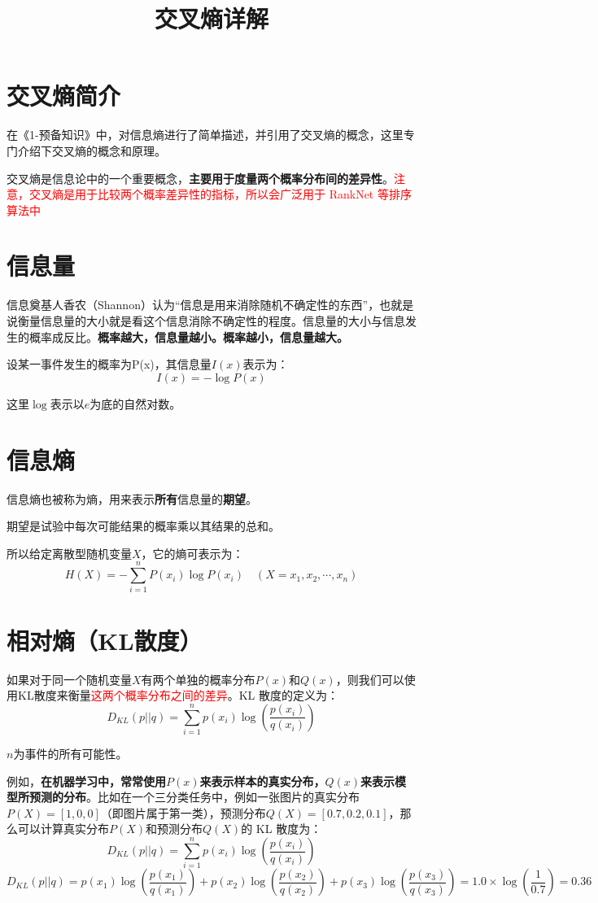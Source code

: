 \documentclass[12pt]{article}
\title{交叉熵详解\cite{CrossEntropy_Detail}}
\begin{document}
\section{交叉熵简介\cite{CrossEntropy_Detail}}
在《1-预备知识》中，对信息熵进行了简单描述，并引用了交叉熵的概念，这里专门介绍下交叉熵的概念和原理。

交叉熵是信息论中的一个重要概念，\textbf{主要用于度量两个概率分布间的差异性}。\textcolor{red}{注意，交叉熵是用于比较两个概率差异性的指标，所以会广泛用于 RankNet 等排序算法中}

\section{信息量}
信息奠基人香农（Shannon）认为“信息是用来消除随机不确定性的东西”，也就是说衡量信息量的大小就是看这个信息消除不确定性的程度。信息量的大小与信息发生的概率成反比。\textbf{概率越大，信息量越小。概率越小，信息量越大。}

设某一事件发生的概率为P(x)，其信息量$I(x)$表示为：
$$
I(x) = -\log{P(x)}
$$

这里$\log$表示以$e$为底的自然对数。

\section{信息熵}
信息熵也被称为熵，用来表示\textbf{所有}信息量的\textbf{期望}。

期望是试验中每次可能结果的概率乘以其结果的总和。

所以给定离散型随机变量$X$，它的熵可表示为：
$$
H(X) = -\sum_{i=1}^nP(x_i)\log{P(x_i)} \quad (X = x_1, x_2, \cdots, x_n)
$$

\section{相对熵（KL散度）}
如果对于同一个随机变量$X$有两个单独的概率分布$P(x)$和$Q(x)$，则我们可以使用KL散度来衡量\textcolor{red}{这两个概率分布之间的差异}。KL 散度的定义为：
$$
D_{KL}(p||q) = \sum_{i=1}^np(x_i)\log{(\frac{p(x_i)}{q(x_i)})}
$$

$n$为事件的所有可能性。

例如，\textbf{在机器学习中，常常使用$P(x)$来表示样本的真实分布，$Q(x)$来表示模型所预测的分布}。比如在一个三分类任务中，例如一张图片的真实分布$P(X)=[1,0,0]$（即图片属于第一类），预测分布$Q(X) = [0.7,0.2,0.1]$，那么可以计算真实分布$P(X)$和预测分布$Q(X)$的 KL 散度为：
$$
D_{KL}(p||q) = \sum_{i=1}^np(x_i)\log{(\frac{p(x_i)}{q(x_i)})}
$$
$$
D_{KL}(p||q) = p(x_1)\log(\frac{p(x_1)}{q(x_1)}) + p(x_2)\log(\frac{p(x_2)}{q(x_2)}) + p(x_3)\log(\frac{p(x_3)}{q(x_3)}) = 1.0 \times \log(\frac{1}{0.7}) = 0.36
$$
\end{document}
